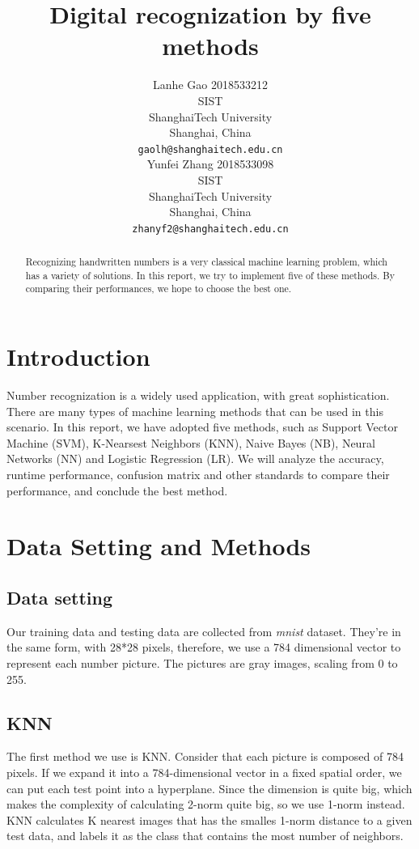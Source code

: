 \documentclass{article}
\title{Digital recognization by five methods}
\author{
	Lanhe Gao 2018533212\\
	SIST\\
	ShanghaiTech University\\
	Shanghai, China \\
	\texttt{gaolh@shanghaitech.edu.cn} \\
	\And
	Yunfei Zhang 2018533098\\
	SIST\\
	ShanghaiTech University\\
	Shanghai, China \\
	\texttt{zhanyf2@shanghaitech.edu.cn} \\
}
\begin{document}
	
	\maketitle
	
	\begin{abstract}
		Recognizing handwritten numbers is a very classical machine learning problem, which has a variety of solutions. In this report, we try to implement five of these methods. By comparing their performances, we hope to choose the best one.
	\end{abstract}

	\section{Introduction}
	
	Number recognization is a widely used application, with great sophistication. There are many types of machine learning methods that can be used in this scenario. In this report, we have adopted five methods, such as Support Vector Machine (SVM), K-Nearsest Neighbors (KNN), Naive Bayes (NB), Neural Networks (NN) and Logistic Regression (LR). We will analyze the accuracy, runtime performance, confusion matrix and other standards to compare their performance, and conclude the best method.
	
	\section{Data Setting and Methods}
	
	\subsection{Data setting}
	
	Our training data and testing data are collected from \textit{mnist} dataset. They're in the same form, with 28*28 pixels, therefore, we use a 784 dimensional vector to represent each number picture. The pictures are gray images, scaling from 0 to 255.
	
	\subsection{KNN}
	
	The first method we use is KNN. Consider that each picture is composed of 784 pixels. If we expand it into a 784-dimensional vector in a fixed spatial order, we can put each test point into a hyperplane. Since the dimension is quite big, which makes the complexity of calculating 2-norm quite big, so we use 1-norm instead. KNN calculates K nearest images that has the smalles 1-norm distance to a given test data, and labels it as the class that contains the most number of neighbors. 
	
\end{document}
